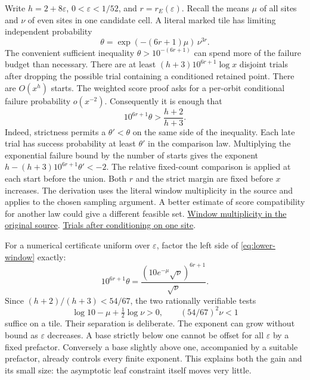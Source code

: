 \documentclass[12pt,letterpaper]{article}
\begin{document}
Write \(h=2+8\varepsilon\), \(0<\varepsilon<1/52\), and \(r=r_E(\varepsilon)\). Recall the means \(\mu\) of all sites and \(\nu\) of even sites in one candidate cell. A literal marked tile has limiting independent probability
\[
        \theta=\exp(-(6r+1)\mu)\,\nu^{3r}.
\]
The convenient sufficient inequality \(\theta>10^{-(6r+1)}\) can spend more of the failure budget than necessary. There are at least \((h+3)10^{6r+1}\log x\) disjoint trials after dropping the possible trial containing a conditioned retained point. There are \(O(x^h)\) starts. The weighted score proof asks for a per-orbit conditional failure probability \(o(x^{-2})\). Consequently it is enough that
\begin{equation}
       10^{6r+1}\theta > \frac{h+2}{h+3}.
       \label{eq:lower-window}
\end{equation}
Indeed, strictness permits a \(\theta'<\theta\) on the same side of the inequality. Each late trial has success probability at least \(\theta'\) in the comparison law. Multiplying the exponential failure bound by the number of starts gives the exponent \(h-(h+3)10^{6r+1}\theta'<-2\). The relative fixed-count comparison is applied at each start before the union. Both \(r\) and the strict margin are fixed before \(x\) increases. The derivation uses the literal window multiplicity in the source and applies to the chosen sampling argument. A better estimate of score compatibility for another law could give a different feasible set.
\href{https://github.com/nousentllc/riemann-hypothesis/blob/40e56bab026552e089d7afcfeff08d2defb9c005/src/Formalism/SharpRestriction/GrowthBounds/UnramifiedQuadraticSetting.lean#L239-L251}{Window multiplicity in the original source}.
\href{https://github.com/nousentllc/riemann-hypothesis/blob/40e56bab026552e089d7afcfeff08d2defb9c005/src/Development/AutomorphicArithmetic/ThickFrames/TilesLe.lean#L43-L67}{Trials after conditioning on one site}.

For a numerical certificate uniform over \(\varepsilon\), factor the left side of \eqref{eq:lower-window} exactly:
\[
       10^{6r+1}\theta
       =\frac{(10e^{-\mu}\sqrt{\nu})^{6r+1}}{\sqrt{\nu}} .
\]
Since \((h+2)/(h+3)<54/67\), the two rationally verifiable tests
\[
    \log 10-\mu+\tfrac12\log\nu>0,
    \qquad (54/67)^2\nu<1
\]
suffice on a tile. Their separation is deliberate. The exponent can grow without bound as \(\varepsilon\) decreases. A base strictly below one cannot be offset for all \(\varepsilon\) by a fixed prefactor. Conversely a base slightly above one, accompanied by a suitable prefactor, already controls every finite exponent. This explains both the gain and its small size: the asymptotic leaf constraint itself moves very little.
\end{document}

